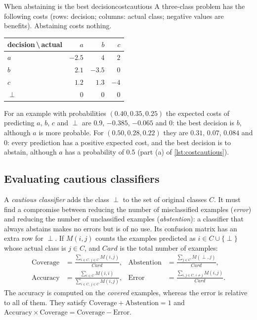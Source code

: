 \begin{example}{When abstaining is the best decision}{costcautious}
A three-class problem has the following costs (rows: decision; columns: actual class; negative
values are benefits). Abstaining costs nothing.
\begin{center}\small
\begin{tabular}{@{}lrrr@{}}
\toprule
{\footnotesize decision\,\textbackslash\,actual} & $a$ & $b$ & $c$\\
\midrule
$a$ & $-2.5$ & $4$ & $2$\\
$b$ & $2.1$ & $-3.5$ & $0$\\
$c$ & $1.2$ & $1.3$ & $-4$\\
$\perp$ & $0$ & $0$ & $0$\\
\bottomrule
\end{tabular}
\end{center}
For an example with probabilities $(0.40,0.35,0.25)$ the expected costs of predicting $a$, $b$,
$c$ and $\perp$ are $0.9$, $-0.385$, $-0.065$ and $0$: the best decision is $b$, although $a$ is
more probable. For $(0.50,0.28,0.22)$ they are $0.31$, $0.07$, $0.084$ and $0$: every prediction
has a positive expected cost, and the best decision is to abstain, although $a$ has a
probability of 0.5 (part (a) of \cref{lst:costcautious}).
\end{example}

\subsection{Evaluating cautious classifiers}

A \emph{cautious classifier} \citep{ferri2004cautious} adds the class $\perp$ to the set of
original classes $C$. It must find a compromise between reducing the number of misclassified
examples (\emph{error}) and reducing the number of unclassified examples (\emph{abstention}):
a classifier that always abstains makes no errors but is of no use. Its confusion matrix has an extra row for
$\perp$. If $M(i,j)$ counts the examples predicted as $i\in C\cup\{\perp\}$ whose actual class is
$j\in C$, and $\mathit{Card}$ is the total number of examples:
\begin{align}
  \text{Coverage}&=\frac{\sum_{i\in C,\,j\in C}M(i,j)}{\mathit{Card}}, &
  \text{Abstention}&=\frac{\sum_{j\in C}M(\perp,j)}{\mathit{Card}},\\
  \text{Accuracy}&=\frac{\sum_{i\in C}M(i,i)}{\sum_{i\in C,\,j\in C}M(i,j)}, &
  \text{Error}&=\frac{\sum_{i,j\in C,\,i\neq j}M(i,j)}{\mathit{Card}}.
\end{align}
The accuracy is computed on the \emph{covered} examples, whereas the error is relative to all of
them. They satisfy $\text{Coverage}+\text{Abstention}=1$ and
$\text{Accuracy}\times\text{Coverage}=\text{Coverage}-\text{Error}$.

